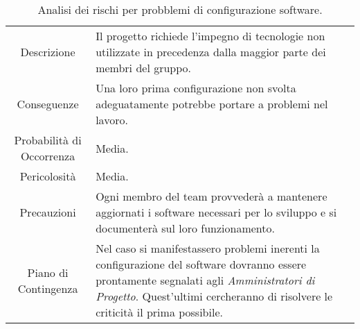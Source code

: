 \begin{table} [H]
    \begin{tabular}{|c|p{10cm}|}
        \rowcolor{darkblue}
    \hline
    \multicolumn{2}{|c|}{\textcolor{white}{\textbf{RT4 - Problemi nella Configurazione Software}}} \\
    \hline
    Descrizione & Il progetto richiede l'impegno di tecnologie non utilizzate in precedenza dalla maggior parte dei membri del gruppo.\\ 
    \hline
    Conseguenze & Una loro prima configurazione non svolta adeguatamente potrebbe portare a problemi nel lavoro.\\
    \hline
     Probabilità di Occorrenza & Media.\\
     \hline
     Pericolosità & Media.\\
     \hline
     Precauzioni & Ogni membro del team provvederà a mantenere aggiornati i software necessari per lo sviluppo e si documenterà sul loro funzionamento.\\
     \hline
     Piano di Contingenza & Nel caso si manifestassero problemi inerenti la configurazione del software dovranno essere prontamente segnalati agli \textit{Amministratori di Progetto}. Quest'ultimi cercheranno di risolvere le criticità il prima possibile.\\ 
     \hline
    \end{tabular}
    \caption{\label{tab:RT4}Analisi dei rischi per probblemi di configurazione software.}
\end{table}